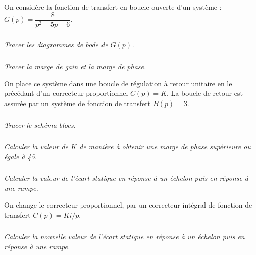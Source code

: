 \documentclass[10pt,fleqn]{article} %
\begin{document}

\vspace{5cm}
\pagestyle{fancy}
\thispagestyle{plain}

\def\columnseprulecolor{\color{ocre}}
\setlength{\columnseprule}{0.4pt} 

\def\pathfig{images}

\begin{multicols}{2}

On considère la fonction de transfert en boucle ouverte d’un système : $G(p)=\dfrac{8}{p^2+5p+6}$.

\subparagraph{}
\textit{Tracer les diagrammes de bode de $G(p)$.}
\ifprof
\begin{corrige}
\end{corrige}
\else
\fi

\subparagraph{}
\textit{Tracer la marge de gain et la marge de phase.}
\ifprof
\begin{corrige}
\end{corrige}
\else
\fi

On place ce système dans une boucle de régulation à retour unitaire en le précédant d’un correcteur proportionnel $C(p)=K$. La boucle de retour est assurée par un système de fonction de transfert $B(p)=3$.

\subparagraph{}
\textit{Tracer le schéma-blocs.}
\ifprof
\begin{corrige}
\end{corrige}
\else
\fi

\subparagraph{}
\textit{Calculer la valeur de $K$ de manière à obtenir une marge de phase supérieure ou égale à 45\degres.}
\ifprof
\begin{corrige}
\end{corrige}
\else
\fi

\subparagraph{}
\textit{Calculer la valeur de l’écart statique en réponse à un échelon puis en réponse à une rampe.}
\ifprof
\begin{corrige}
\end{corrige}
\else
\fi

On change le correcteur proportionnel, par un correcteur intégral de fonction de transfert $C(p)=Ki/p$.
\subparagraph{}
\textit{Calculer la nouvelle valeur de l’écart statique en réponse à un échelon puis en réponse à une rampe.}
\ifprof
\begin{corrige}
\end{corrige}
\else
\fi

\end{multicols}
%
%
%
%
\end{document}
